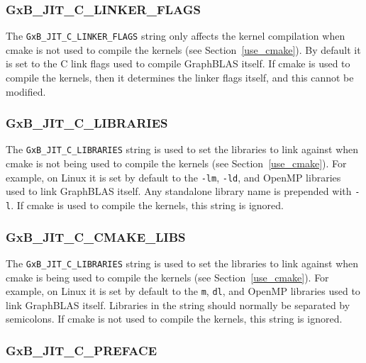 \documentclass[12pt]{article}
\begin{document}
\subsubsection{\sf GxB\_JIT\_C\_LINKER\_FLAGS}

The \verb'GxB_JIT_C_LINKER_FLAGS' string only affects the kernel compilation
when cmake is not used to compile the kernels (see Section~\ref{use_cmake}).
By default it is set to the C link flags used to compile GraphBLAS itself.
If cmake is used to compile the kernels, then it determines the linker flags
itself, and this cannot be modified.

\subsubsection{\sf GxB\_JIT\_C\_LIBRARIES}

The \verb'GxB_JIT_C_LIBRARIES' string is used to set the libraries to link
against when cmake is not being used to compile the kernels (see
Section~\ref{use_cmake}).  For example, on Linux it is set by default to the
\verb'-lm', \verb'-ld', and OpenMP libraries used to link GraphBLAS itself.
Any standalone library name is prepended with \verb'-l'.  If cmake is used to
compile the kernels, this string is ignored.

\subsubsection{\sf GxB\_JIT\_C\_CMAKE\_LIBS}

The \verb'GxB_JIT_C_LIBRARIES' string is used to set the libraries to link
against when cmake is being used to compile the kernels (see
Section~\ref{use_cmake}).  For example, on Linux it is set by default to the
\verb'm', \verb'dl', and OpenMP libraries used to link GraphBLAS itself.
Libraries in the string should normally be separated by semicolons.  If cmake
is not used to compile the kernels, this string is ignored.

\subsubsection{\sf GxB\_JIT\_C\_PREFACE}
\end{document}
